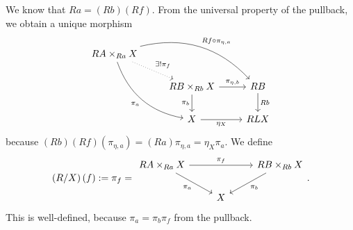 We know that $Ra = (Rb)(Rf)$. From the universal property of the pullback, we obtain a unique morphism
\[\begin{tikzcd}
RA \times_{Ra} X \arrow[dr, dotted, "\exists! \pi_f"] \arrow[ddr, bend right, swap, "\pi_a"] \arrow[drr, bend left, "Rf \circ \pi_{\eta,a}"] \\
& RB \times_{Rb} X \arrow[r, "\pi_{\eta,b}"] \arrow[d, swap, "\pi_b"] & RB \arrow[d, "Rb"] \\
& X \arrow[r, swap, "\eta_X"] & RLX
\end{tikzcd}\]
because $(Rb)(Rf)(\pi_{\eta,a}) = (Ra)\pi_{\eta,a} = \eta_X \pi_a$. We define
\[ \left( R/X \right)(f) := \pi_f = \begin{tikzcd}
RA \times_{Ra} X \arrow[rr, "\pi_f"] \arrow[dr, swap, "\pi_a"] & & RB \times_{Rb} X \arrow[dl, "\pi_b"] \\
& X &  
\end{tikzcd}. \]
This is well-defined, because $\pi_a = \pi_b \pi_f$ from the pullback.

